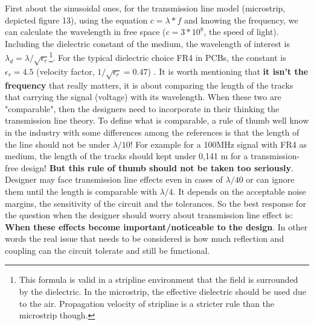 \documentclass[final]{cubedoc}
\begin{document}
	
	First about the sinusoidal ones, for the transmission line model (microstrip, depicted figure 13), using the equation $ c = \lambda*f$ and knowing the frequency, we can calculate the wavelength in free space ($c = 3*10^8$, the speed of light). Including the dielectric constant of the medium, the wavelength of interest is $\lambda_d = \lambda/\sqrt{\epsilon_r}$\footnote{This formula is valid in a stripline environment that the field is surrounded by the dielectric. In the microstrip, the effective dielectric should be used due to the air. Propagation velocity of stripline is a stricter rule than the microstrip though.}. For the typical dielectric choice FR4 in PCBs, the constant is $\epsilon_r = 4.5$ (velocity factor, $1/\sqrt{\epsilon_r} = 0.47$) \cite[p.46]{williams2004circuit}.
	It is worth mentioning that \textbf{it isn't the frequency} that really matters, it is about comparing the length of the tracks that carrying the signal (voltage) with its wavelength. When these two are "comparable", then the designers need to incorporate in their thinking the transmission line theory. To define what is comparable, a rule of thumb well know in the industry with some differences among the references is that the length of the line should not be under $\lambda/10$! For example for a 100MHz signal with FR4 as medium, the length of the tracks should kept under 0,141 m for a transmission-free design! \textbf{But this rule of thumb should not be taken too seriously}. Designer may face transmission line effects even in cases of $\lambda/40$ or can ignore them until the length is comparable with $\lambda/4$. It depends on the acceptable noise margins, the sensitivity of the circuit and the tolerances. So the best response for the question when the designer should worry about transmission line effect is: \textbf{When these effects become important/noticeable to the design}. In other words the real issue that needs to be considered is how much reflection and coupling can the circuit tolerate and still be functional.
	
\end{document}
